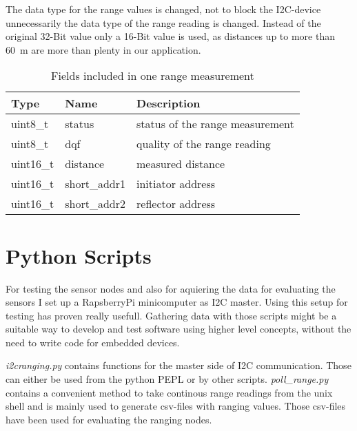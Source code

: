 The data type for the range values is changed, not to block the I2C-device unnecessarily the data type of the range reading is changed.
Instead of the original 32-Bit value only a 16-Bit value is used, as distances up to more than \SI{60}{\metre} are more than plenty in our application.

\begin{table}
	
	\begin{tabularx}{\columnwidth}{l | l | X}
	Type & Name & Description \\ \hline
		uint8\_t  & status       & status of the range measurement \\
		uint8\_t  & dqf          & quality of the range reading \\
		uint16\_t & distance     & measured distance \\
		uint16\_t & short\_addr1 & initiator address \\
		uint16\_t & short\_addr2 & reflector address \\
	\end{tabularx}

	\caption{Fields included in one range measurement}
	\label{rangefields}
	
\end{table}




%
%

\section{Python Scripts}

For testing the sensor nodes and also for aquiering the data for evaluating the sensors I set up a RapsberryPi minicomputer as I2C master.
Using this setup for testing has proven really usefull.
Gathering data with those scripts might be a suitable way to develop and test software using higher level concepts, without the need to write code for embedded devices.

\emph{i2cranging.py} contains functions for the master side of I2C communication. Those can either be used from the python PEPL or by other scripts.
\emph{poll\_range.py} contains a convenient method to take continous range readings from the unix shell and is mainly used to generate csv-files with ranging values.
Those csv-files have been used for evaluating the ranging nodes.
